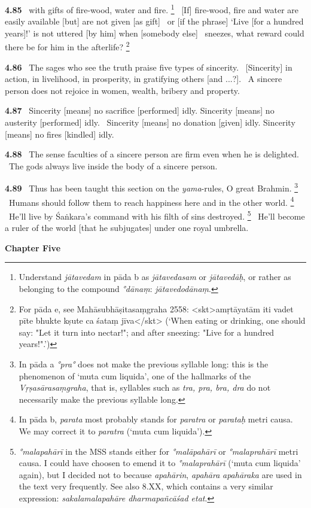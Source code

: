 \documentclass{article}
\newcommand{\skt}[1]{\textit{#1}}
\begin{document}
\textbf{4.85}%
\ with gifts of fire-wood, water and fire.%
\footnote{Understand \skt{jātavedam} in pāda b as \skt{jātavedasam} or \skt{jātavedāḥ},                or rather as belonging to the compound \skt{°dānaṃ}: \skt{jātavedodānaṃ}. }%
\ [If] fire-wood, fire and water are easily available [but] are not given [as gift]%
\ or [if the phrase] `Live [for a hundred years]!' is not uttered [by him] when [somebody else]%
\                 sneezes, what reward could there be for him in the afterlife?%
\footnote{For pāda e, see Mahāsubhāṣitasaṃgraha 2558:                 <skt>amṛtāyatām iti vadet pīte bhukte kṣute ca śataṃ jīva</skt>                (`When eating or drinking, one should say: "Let it turn into nectar!";                  and after sneezing: "Live for a hundred years!".')  }%


\textbf{4.86}%
\ The sages who see the truth praise five types of sincerity.%
\ [Sincerity] in action, in livelihood, in prosperity, in gratifying others [and ...?].%
\ A sincere person does not rejoice in women, wealth, bribery and property.%


\textbf{4.87}%
\ Sincerity [means] no sacrifice [performed] idly. Sincerity [means] no austerity [performed] idly.%
\ Sincerity [means] no donation [given] idly. Sincerity [means] no fires [kindled] idly.%


\textbf{4.88}%
\ The sense faculties of a sincere person are firm even when he is delighted.%
\ The gods always live inside the body of a sincere person.%


\textbf{4.89}%
\ Thus has been taught this section on the \skt{yama}-rules, O great Brahmin.%
\footnote{In pāda a \skt{°pra°} does not make the previous syllable long: this is the phenomenon of                `muta cum liquida', one of the hallmarks of the \skt{Vṛṣasārasaṃgraha},                 that is, syllables such as \skt{tra, pra, bra, dra} do not necessarily make the                 previous syllable long. }%
\ Humans should follow them to reach happiness here and in the other world.%
\footnote{In pāda b, \skt{parata} most probably stands for \skt{paratra} or \skt{parataḥ} metri causa.         We may correct it to \skt{paratra} (`muta cum liquida'). }%
\ He'll live by Śaṅkara's command with his filth of sins destroyed.%
\footnote{\skt{°malapahārī} in the MSS stands either for \skt{°malāpahārī} or \skt{°malaprahārī} metri causa.                 I could have choosen to emend it to \skt{°malaprahārī} (`muta cum liquida' again),                but I decided not to because \skt{apahārin}, \skt{apahāra}                \skt{apahāraka} are used in the text very frequently. See also 8.XX, which contains a very similar expression:                        \skt{sakalamalapahāre dharmapañcāśad etat}. }%
\ He'll become a ruler of the world [that he subjugates] under one royal umbrella.%
\vfill\pagebreak\begin{center}{\large\textbf{ Chapter Five 
}}\end{center}
\end{document}
